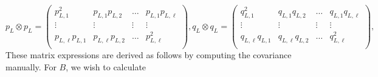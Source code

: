 \documentclass{statsmsc}
\begin{document}
$$
p_L\otimes p_L=\begin{pmatrix}
  p_{L,1}^2 & p_{L,1}p_{L,2} & \dots & p_{L,1}p_{L,\ell} \\
  \vdots & \vdots & \vdots & \vdots \\
  p_{L,\ell}p_{L,1} & p_{L,\ell}p_{L,2} & \dots & p_{L,\ell}^2 \\
\end{pmatrix},
q_L\otimes q_L=\begin{pmatrix}
  q_{L,1}^2 & q_{L,1}q_{L,2} & \dots & q_{L,1}q_{L,\ell} \\
  \vdots & \vdots & \vdots & \vdots \\
  q_{L,\ell}q_{L,1} & q_{L,\ell}q_{L,2} & \dots & q_{L,\ell}^2 \\
\end{pmatrix},
$$ 
These matrix expressions are derived as follows by computing the covariance manually. 
For $B$, we wish to calculate 
\end{document}
